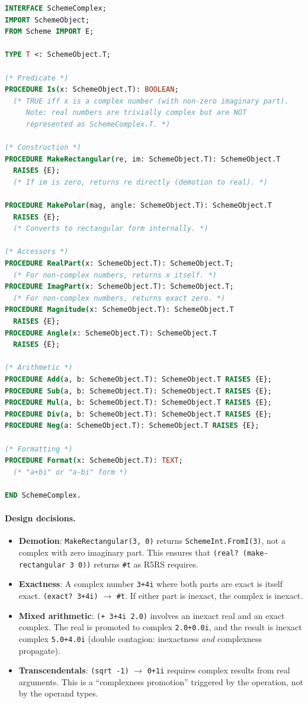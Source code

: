 \documentclass[12pt]{article}
\begin{document}
\begin{lstlisting}[language=Modula3]
INTERFACE SchemeComplex;
IMPORT SchemeObject;
FROM Scheme IMPORT E;

TYPE T <: SchemeObject.T;

(* Predicate *)
PROCEDURE Is(x: SchemeObject.T): BOOLEAN;
  (* TRUE iff x is a complex number (with non-zero imaginary part).
     Note: real numbers are trivially complex but are NOT
     represented as SchemeComplex.T. *)

(* Construction *)
PROCEDURE MakeRectangular(re, im: SchemeObject.T): SchemeObject.T
  RAISES {E};
  (* If im is zero, returns re directly (demotion to real). *)

PROCEDURE MakePolar(mag, angle: SchemeObject.T): SchemeObject.T
  RAISES {E};
  (* Converts to rectangular form internally. *)

(* Accessors *)
PROCEDURE RealPart(x: SchemeObject.T): SchemeObject.T;
  (* For non-complex numbers, returns x itself. *)
PROCEDURE ImagPart(x: SchemeObject.T): SchemeObject.T;
  (* For non-complex numbers, returns exact zero. *)
PROCEDURE Magnitude(x: SchemeObject.T): SchemeObject.T
  RAISES {E};
PROCEDURE Angle(x: SchemeObject.T): SchemeObject.T
  RAISES {E};

(* Arithmetic *)
PROCEDURE Add(a, b: SchemeObject.T): SchemeObject.T RAISES {E};
PROCEDURE Sub(a, b: SchemeObject.T): SchemeObject.T RAISES {E};
PROCEDURE Mul(a, b: SchemeObject.T): SchemeObject.T RAISES {E};
PROCEDURE Div(a, b: SchemeObject.T): SchemeObject.T RAISES {E};
PROCEDURE Neg(a: SchemeObject.T): SchemeObject.T RAISES {E};

(* Formatting *)
PROCEDURE Format(x: SchemeObject.T): TEXT;
  (* "a+bi" or "a-bi" form *)

END SchemeComplex.
\end{lstlisting}

\paragraph{Design decisions.}
\begin{itemize}
\item \textbf{Demotion}: {\tt MakeRectangular(3, 0)} returns
  {\tt SchemeInt.FromI(3)}, not a complex with zero imaginary part.
  This ensures that {\tt (real? (make-rectangular 3 0))} returns
  {\tt \#t} as R5RS requires.
\item \textbf{Exactness}: A complex number {\tt 3+4i} where both
  parts are exact is itself exact.  {\tt (exact? 3+4i)} $\to$ {\tt \#t}.
  If either part is inexact, the complex is inexact.
\item \textbf{Mixed arithmetic}: {\tt (+ 3+4i 2.0)} involves an
  inexact real and an exact complex.  The real is promoted to
  complex {\tt 2.0+0.0i}, and the result is inexact complex
  {\tt 5.0+4.0i} (double contagion: inexactness \emph{and}
  complexness propagate).
\item \textbf{Transcendentals}: {\tt (sqrt -1)} $\to$ {\tt 0+1i}
  requires complex results from real arguments.  This is a
  ``complexness promotion'' triggered by the operation, not by
  the operand types.
\end{itemize}
\end{document}

